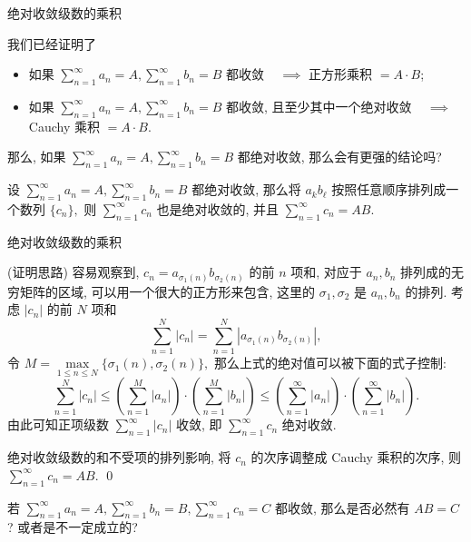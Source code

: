 
\begin{frame}{绝对收敛级数的乘积}

\begin{question}
我们已经证明了
\begin{itemize}
\item 如果 $\sum\limits_{n=1}^\infty a_n = A, \sum\limits_{n=1}^\infty b_n = B$ 都收敛 ~ $\implies$ 正方形乘积 $ = A \cdot B$;
\item 如果 $\sum\limits_{n=1}^\infty a_n = A, \sum\limits_{n=1}^\infty b_n = B$ 都收敛, 且至少其中一个绝对收敛 ~ $\implies$ Cauchy 乘积 $ = A \cdot B$.
\end{itemize}
那么, 如果 $\sum\limits_{n=1}^\infty a_n = A, \sum\limits_{n=1}^\infty b_n = B$ 都绝对收敛, 那么会有更强的结论吗?
\end{question}

\pause

\begin{thm}
设 $\sum\limits_{n=1}^\infty a_n = A, \sum\limits_{n=1}^\infty b_n = B$ 都绝对收敛, 那么将 $a_k b_\ell$ 按照任意顺序排列成一个数列 $\{c_n\},$ 则 $\sum\limits_{n=1}^\infty c_n$ 也是绝对收敛的, 并且 $\sum\limits_{n=1}^\infty c_n = AB.$
\end{thm}

\end{frame}


\begin{frame}{绝对收敛级数的乘积}

\startproof[bg=yellow, fg=red](证明思路)
容易观察到, $c_n = a_{\sigma_1(n)} b_{\sigma_2(n)}$ 的前 $n$ 项和, 对应于 $a_n, b_n$ 排列成的无穷矩阵的区域, 可以用一个很大的正方形来包含, 这里的 $\sigma_1, \sigma_2$ 是 $a_n, b_n$ 的排列. 考虑 $|c_n|$ 的前 $N$ 项和
\[
\sum\limits_{n=1}^N |c_n| = \sum\limits_{n=1}^N |a_{\sigma_1(n)} b_{\sigma_2(n)}|,
\]
令 $M = \max\limits_{1 \leqslant n \leqslant N} \{\sigma_1(n), \sigma_2(n)\},$ 那么上式的绝对值可以被下面的式子控制:
\[
\sum\limits_{n=1}^N |c_n| \leqslant \left( \sum\limits_{n=1}^M |a_n| \right) \cdot \left( \sum\limits_{n=1}^M |b_n| \right) \leqslant \left( \sum\limits_{n=1}^\infty |a_n| \right) \cdot \left( \sum\limits_{n=1}^\infty |b_n| \right).
\]
由此可知正项级数 $\sum\limits_{n=1}^\infty |c_n|$ 收敛, 即 $\sum\limits_{n=1}^\infty c_n$ 绝对收敛.

\pause

绝对收敛级数的和不受项的排列影响, 将 $c_n$ 的次序调整成 Cauchy 乘积的次序, 则 $\sum\limits_{n=1}^\infty c_n = AB.$
\qed

\pause

\begin{question}
若 $\sum\limits_{n=1}^\infty a_n = A, \sum\limits_{n=1}^\infty b_n = B, \sum\limits_{n=1}^\infty c_n = C$ 都收敛, 那么是否必然有 $AB = C$? 或者是不一定成立的?
\end{question}

\end{frame}

